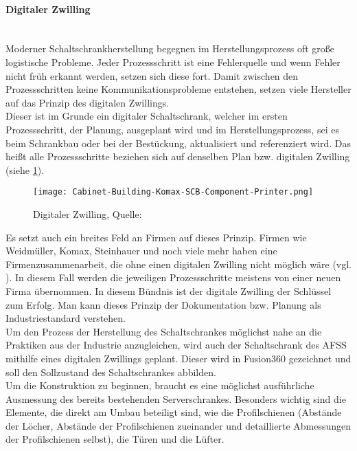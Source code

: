     \paragraph{Digitaler Zwilling}\mbox{}\\
    Moderner Schaltschrankherstellung begegnen im Herstellungsprozess oft große logistische Probleme. Jeder Prozessschritt ist eine Fehlerquelle und wenn Fehler nicht früh erkannt werden, setzen sich diese fort. Damit zwischen den Prozessschritten keine Kommunikationsprobleme entstehen, setzen viele Hersteller auf das Prinzip des digitalen Zwillings.\\
    Dieser ist im Grunde ein digitaler Schaltschrank, welcher im ersten Prozessschritt, der Planung, ausgeplant wird und im Herstellungsprozess, sei es beim Schrankbau oder bei der Bestückung, aktualisiert und referenziert wird. Das heißt alle Prozessschritte beziehen sich auf denselben Plan bzw. digitalen Zwilling (siehe \ref{fig:digilaerZwilling}).
    \begin{figure}[h]
        \centering
        \texttt{[image: Cabinet-Building-Komax-SCB-Component-Printer.png]}
        \caption{Digitaler Zwilling, Quelle: \cite{digitaler_zwilling_bild}}
        \label{fig:digilaerZwilling}
    \end{figure}
    Es setzt auch ein breites Feld an Firmen auf dieses Prinzip. Firmen wie Weidmüller, Komax, Steinhauer und noch viele mehr haben eine Firmenzusammenarbeit, die ohne einen digitalen Zwilling nicht möglich wäre (vgl. \cite{smart_cabinet_building}). In diesem Fall werden die jeweiligen Prozessschritte meistens von einer neuen Firma übernommen. In diesem Bündnis ist der digitale Zwilling der Schlüssel zum Erfolg. Man kann dieses Prinzip der Dokumentation bzw. Planung als Industriestandard verstehen.\\
    Um den Prozess der Herstellung des Schaltschrankes möglichst nahe an die Praktiken aus der Industrie anzugleichen, wird auch der Schaltschrank des AFSS mithilfe eines digitalen Zwillings geplant. Dieser wird in Fusion360 gezeichnet und soll den Sollzustand des Schaltschrankes abbilden.\\
    Um die Konstruktion zu beginnen, braucht es eine möglichst ausführliche Ausmessung des bereits bestehenden Serverschrankes. Besonders wichtig sind die Elemente, die direkt am Umbau beteiligt sind, wie die Profilschienen (Abstände der Löcher, Abstände der Profilschienen zueinander und detaillierte Abmessungen der Profilschienen selbst), die Türen und die Lüfter.\\

